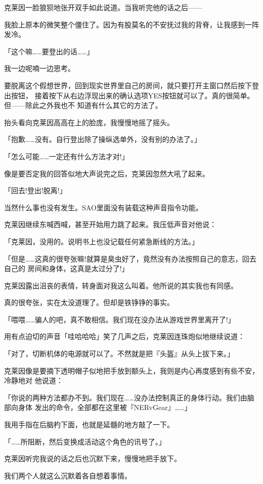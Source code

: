 \documentclass[11pt]{book}
\begin{document}
克莱因一脸狼狈地张开双手如此说道。当我听完他的话之后——

我脸上原本的微笑整个僵住了。因为有股莫名的不安抚过我的背脊，让我感到一阵发冷。

「这个嘛……要登出的话……」

我一边呢喃一边思考。

要脱离这个假想世界，回到现实世界里自己的房间，就只要打开主窗口然后按下登出按钮，
接着按下从右边浮现出来的确认选项YES按钮就可以了。真的很简单。但——除此之外我也不
知道有什么其它的方法了。

抬头看向克莱因高高在上的脸庞，我慢慢地摇了摇头。

「抱歉……没有。自行登出除了操纵选单外，没有别的办法了。」

「怎么可能……一定还有什么方法才对!」

像是要否定我的回答似地大声说完之后，克莱因忽然大吼了起来。

「回去!登出!脱离!」

当然什么事也没有发生。SAO里面没有装载这种声音指令功能。

克莱因继续东喊西喊，甚至开始用力跳了起来。我压低声音对他说：

「克莱因，没用的。说明书上也没记载任何紧急断线的方法。」

「但是……这真的很夸张嘛!就算是臭虫好了，竟然没有办法按照自己的意志，回去自己的
房间和身体，这真是太过分了!」

克莱因露出沮丧的表情，转身面对我这么叫着。他所说的其实我也有同感。

真的很夸张，实在太没道理了。但却是铁铮铮的事实。

「喂喂……骗人的吧，真不敢相信。我们现在没办法从游戏世界里离开了!」

用有点迫切的声音「哇哈哈哈」笑了几声之后，克莱因连珠炮似地继续说道：

「对了，切断机体的电源就可以了。不然就是把『头盔』从头上拔下来。」

克莱因像是要摘下透明帽子似地把手放到额头上，我则是内心再度感到有些不安，冷静地对
他说道：

「你说的两种方法都办不到。我们现在……没办法控制真正的身体行动。我们由脑部向身体
发出的命令，全部都在这里被『NERvGear』……」

我用手指在后脑杓下面，也就是延髓的地方敲了一下。

「……所阻断，然后变换成活动这个角色的讯号了。」

克莱因听完我说的话之后也沉默下来，慢慢地把手放下。

我们两个人就这么沉默着各自想着事情。
\end{document}
